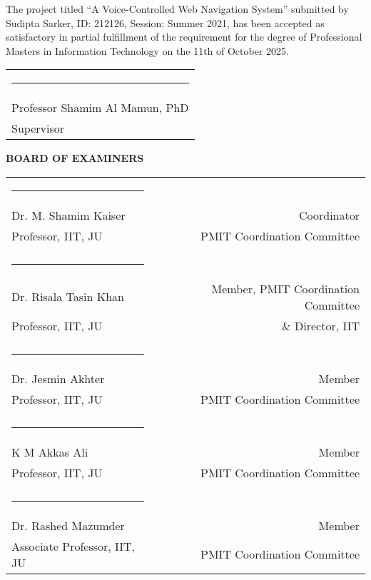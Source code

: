 The project titled “A Voice-Controlled Web Navigation System” submitted by Sudipta Sarker, ID: 212126, Session: Summer 2021, has been accepted as satisfactory in partial fulfillment of the requirement for the degree of Professional Masters in Information Technology on the 11th of October 2025.


\bigskip
\bigskip
\bigskip

\noindent \begin{tabular}{l}

  \rule{4cm}{1pt} \\
  Professor Shamim Al Mamun, PhD\\ %
  Supervisor\\

\end{tabular}




\begin{center}
   \textbf{BOARD OF EXAMINERS}
\end{center}
\noindent \begin{tabular}{lp{1cm}r}
\centering
  \rule{4cm}{1pt}&\\
     Dr. M. Shamim Kaiser  && Coordinator  \\
     Professor, IIT, JU  & & PMIT Coordination Committee  \\
     & &  \\
     \rule{4cm}{1pt}&\\
    Dr. Risala Tasin Khan  & &  Member, PMIT Coordination Committee   \\
     Professor, IIT, JU  & &\& Director, IIT\\
    & &  \\
     \rule{4cm}{1pt}&\\
     Dr. Jesmin Akhter & & Member  \\
      Professor, IIT, JU  & & PMIT Coordination Committee  \\
     &  \\
     \rule{4cm}{1pt}&\\
     K M Akkas Ali   & & Member  \\
      Professor, IIT, JU  & & PMIT Coordination Committee  \\
      &  \\
     \rule{4cm}{1pt}&\\
      Dr. Rashed Mazumder & &  Member  \\
      Associate Professor, IIT, JU  & & PMIT Coordination Committee  \\
     
   

\end{tabular}


